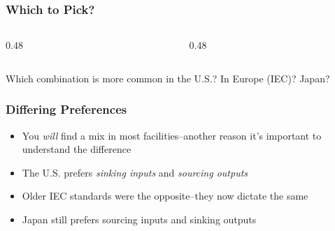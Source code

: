 \begin{frame}
    \frametitle{Which to Pick?}

    \begin{columns}
        \begin{column}{0.48\linewidth}
            \begin{figure}
                \centering
                \resizebox{0.75\columnwidth}{!}{
                    
                }
            \end{figure}
            
            \vspace{0.5em}

            \begin{figure}
                \centering
                \resizebox{0.75\columnwidth}{!}{
                    
                }
            \end{figure}
        \end{column}
        \begin{column}{0.48\linewidth}
            \begin{figure}
                \centering
                \resizebox{0.75\columnwidth}{!}{
                    
                }
            \end{figure}

            \vspace{0.5em}

            \begin{figure}
                \centering
                \resizebox{0.75\columnwidth}{!}{
                    
                }
            \end{figure}
        \end{column}
    \end{columns}

    \vspace{0.5em}

    \centering
    {\footnotesize Which combination is more common in the U.S.? In Europe (IEC)? Japan?\par}
\end{frame}

\begin{frame}
    \frametitle{Differing Preferences}

    \begin{itemize}
        \item You \emph{will} find a mix in most facilities--another reason it's important to understand the difference
        \item The U.S. prefers \emph{sinking inputs} and \emph{sourcing outputs}
        \item Older IEC standards were the opposite--they now dictate the same
        \item Japan still prefers sourcing inputs and sinking outputs
    \end{itemize}
\end{frame}

